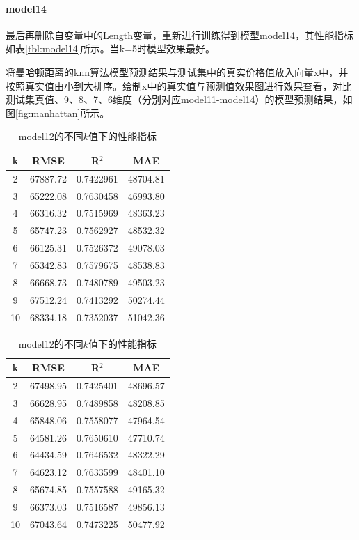 \documentclass[a4paper,12pt,onecolumn,oneside]{article}
\begin{document}
	\paragraph{model14}最后再删除自变量中的Length变量，重新进行训练得到模型model14，其性能指标如表\ref{tbl:model14}所示。当k=5时模型效果最好。\par 
	将曼哈顿距离的knn算法模型预测结果与测试集中的真实价格值放入向量x中，并按照真实值由小到大排序。绘制x中的真实值与预测值效果图进行效果查看，对比测试集真值、9、8、7、6维度（分别对应model11-model14）的模型预测结果，如图\ref{fig:manhattan}所示。
	\vspace{\baselineskip}	
	\begin{table}[h]
		\centering
		\begin{subtable}{0.45\textwidth}
			\centering
				\begin{tabular}{cccc}
			\toprule
			k & RMSE & R$^2$ & MAE \\
			\midrule
			2 & 67887.72 & 0.7422961 & 48704.81 \\
			\rowcolor{gray!25}3 & 65222.08 & 0.7630458 & 46993.80 \\
			4 & 66316.32 & 0.7515969 & 48363.23 \\
			5 & 65747.23 & 0.7562927 & 48532.32 \\
			6 & 66125.31 & 0.7526372 & 49078.03 \\
			7 & 65342.83 & 0.7579675 & 48538.83 \\
			8 & 66668.73 & 0.7480789 & 49503.23 \\
			9 & 67512.24 & 0.7413292 & 50274.44 \\
			10 & 68334.18 & 0.7352037 & 51042.36 \\
			\bottomrule
		\end{tabular}
		\caption{model11的不同$k$值下的性能指标}
		\label{tbl:model11}
		\end{subtable}
		\hfill
		\begin{subtable}{0.45\textwidth}
			\centering
		\begin{tabular}{cccc}
		\toprule
		k & RMSE & R$^2$ & MAE \\
		\midrule
		2 & 67498.95 & 0.7425401 & 48696.57 \\
		3 & 66628.95 & 0.7489858 & 48208.85 \\
		4 & 65848.06 & 0.7558077 & 47964.54 \\
		5 & 64581.26 & 0.7650610 & 47710.74 \\
		\rowcolor{gray!25}6 & 64434.59 & 0.7646532 & 48322.29 \\
		7 & 64623.12 & 0.7633599 & 48401.10 \\
		8 & 65674.85 & 0.7557588 & 49165.32 \\
		9 & 66373.03 & 0.7516587 & 49856.13 \\
		10 & 67043.64 & 0.7473225 & 50477.92 \\
		\bottomrule
		\end{tabular}
		\caption{model12的不同$k$值下的性能指标}
		\label{tbl:model12}
		\end{subtable}
	\end{table}
\end{document}
